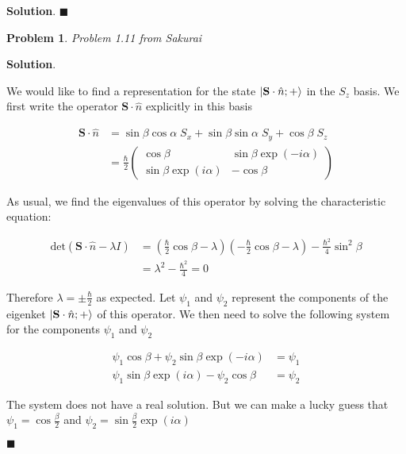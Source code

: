 \documentclass[12pt]{article}
\newtheorem{p}{Problem}
\theoremstyle{definition}
\newenvironment{s}{%
        \begin{trivlist} \item \textbf{Solution}. }{%
            \hspace*{\fill} $\blacksquare$\end{trivlist}}%
\begin{document}
{\begin{s}
\end{s}

\begin{p}
Problem 1.11 from Sakurai
\end{p}

\begin{s} 

We would like to find a representation for the state $\ket{\mathbf{S}\cdot\hat{n}; +}$ in the $S_{z}$ basis. We first write the operator $\mathbf{S}\cdot\hat{n}$ explicitly in this basis

\begin{align*}
\mathbf{S}\cdot\hat{n} &= \sin\beta\cos\alpha \; S_{x} +\sin\beta\sin\alpha\;S_{y} + \cos\beta\; S_{z}\\
&= \frac{\hbar}{2}\begin{pmatrix}
\cos\beta & \sin\beta\exp(-i\alpha)\\
\sin\beta\exp(i\alpha) & -\cos\beta
\end{pmatrix}
\end{align*}

As usual, we find the eigenvalues of this operator by solving the characteristic equation:

\begin{align*}
\mathrm{det}\left(\mathbf{S}\cdot\hat{n} - \lambda I\right) &= \left(\frac{\hbar}{2}\cos\beta - \lambda\right)\left(-\frac{\hbar}{2}\cos\beta - \lambda\right) - \frac{\hbar^{2}}{4}\sin^{2}\beta\\
&= \lambda^{2} - \frac{\hbar^{2}}{4} = 0
\end{align*}

Therefore $\lambda = \pm \frac{\hbar}{2}$ as expected. Let $\psi_{1}$ and $\psi_{2}$ represent the components of the eigenket $\ket{\mathbf{S}\cdot\hat{n}; +}$ of this operator. We then need to solve the following system for the components $\psi_{1}$ and $\psi_{2}$

\begin{align*}
\psi_{1}\cos\beta+\psi_{2}\sin\beta\exp(-i\alpha) &= \psi_{1}\\
\psi_{1}\sin\beta\exp(i\alpha) - \psi_{2}\cos\beta &= \psi_{2}
\end{align*}

The system does not have a real solution. But we can make a lucky guess that $\psi_{1} = \cos\frac{\beta}{2}$ and $\psi_{2} = \sin\frac{\beta}{2}\exp(i\alpha)$


\end{s}
\end{document}

